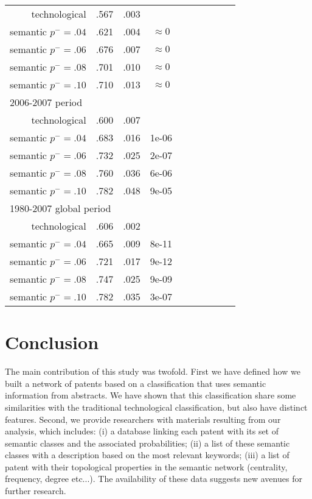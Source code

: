 \documentclass[10pt,A4,draft]{article}
\begin{document}
\begin{table}[!ht]
\begin{tabular}{@{}rccccccccc@{}}
technological & .567 &.003&\\
semantic $p^{-} = .04$ & .621 &.004 & $\approx 0$\\
semantic $p^{-} = .06$ & .676 &.007 & $\approx 0$\\
semantic $p^{-} = .08$ & .701 &.010 & $\approx 0$\\
semantic $p^{-} = .10$ & .710 &.013 & $\approx 0$\\
\multicolumn{4}{l}{2006-2007 period} \\
technological & .600 &.007&\\
semantic $p^{-} = .04$ & .683 &.016 & 1e-06\\
semantic $p^{-} = .06$ & .732 &.025 & 2e-07\\
semantic $p^{-} = .08$ & .760 &.036 & 6e-06\\
semantic $p^{-} = .10$ & .782 &.048 &9e-05\\
\multicolumn{4}{l}{1980-2007 global period} \\
technological & .606 &.002&\\
semantic $p^{-} = .04$ & .665 &.009 & 8e-11\\
semantic $p^{-} = .06$ & .721 &.017 & 9e-12\\
semantic $p^{-} = .08$ & .747 &.025 & 9e-09\\
semantic $p^{-} = .10$ & .782 &.035 & 3e-07\\
\bottomrule
\end{tabular}
\end{table}



\section{Conclusion \label{discussion}}

The main contribution of this study was twofold. First we have defined how we built a network of patents based on a classification that uses semantic information from abstracts. We have shown that this classification share some similarities with the traditional technological classification, but also have distinct features. Second, we provide researchers with materials resulting from our analysis, which includes: (i) a database linking each patent with its set of semantic classes and the associated probabilities; (ii) a list of these semantic classes with a description based on the most relevant keywords; (iii) a list of patent with their topological properties in the semantic network (centrality, frequency, degree etc...). The availability of these data suggests new avenues for further research.
\end{document}
